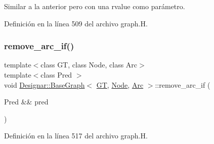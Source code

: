 Similar a la anterior pero con una rvalue como parámetro. 



Definición en la línea 509 del archivo graph.\+H.

\mbox{\label{class_designar_1_1_base_graph_a0e516bee6e0247de6bdd207de57caad6}} 
\subsubsection{\texorpdfstring{remove\+\_\+arc\+\_\+if()}{remove\_arc\_if()}\hspace{0.1cm}{\footnotesize\ttfamily [2/2]}}
{\footnotesize\ttfamily template$<$class GT, class Node, class Arc$>$ \\
template$<$class Pred $>$ \\
void \hyperlink{class_designar_1_1_base_graph}{Designar\+::\+Base\+Graph}$<$ \hyperlink{demo-buildgraph_8_c_a3001c40d2c31ca87ed96cd7d1334a55e}{GT}, \hyperlink{namespace_designar_a5af326c65aa2bd26b26c410f2030d09e}{Node}, \hyperlink{namespace_designar_a3f55fb5513d62ff47cbc8f72b8e95d6f}{Arc} $>$\+::remove\+\_\+arc\+\_\+if (\begin{DoxyParamCaption}\item[{Pred \&\&}]{pred }\end{DoxyParamCaption})\hspace{0.3cm}{\ttfamily [inline]}}



Definición en la línea 517 del archivo graph.\+H.

\mbox{\label{class_designar_1_1_base_graph_ab7c2c2129abb3200b854e23f34e513e8}} 
